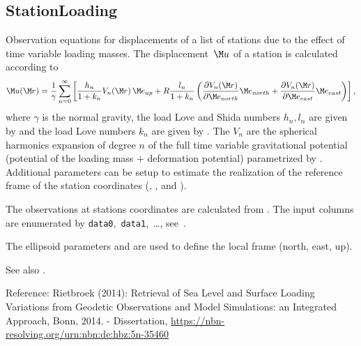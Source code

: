 \subsection{StationLoading}\label{observationType:stationLoading}
Observation equations for displacements of a list of stations
due to the effect of time variable loading masses. The displacement~$\M u$ of a station is calculated according to
\begin{equation}
\M u(\M r) = \frac{1}{\gamma}\sum_{n=0}^\infty \left[\frac{h_n}{1+k_n}V_n(\M r)\,\M e_{up}
+ R\frac{l_n}{1+k_n}\left(
 \frac{\partial V_n(\M r)}{\partial \M e_{north}}\M e_{north}
+\frac{\partial V_n(\M r)}{\partial \M e_{east}} \M e_{east}\right)\right],
\end{equation}
where $\gamma$ is the normal gravity, the load Love and Shida numbers $h_n,l_n$ are given by
 and the load Love numbers $k_n$ are given by
.
The $V_n$ are the spherical harmonics expansion of degree $n$ of the full time variable
gravitational potential (potential of the loading mass + deformation potential)
parametrized by .
Additional parameters can be setup to estimate the realization of the reference frame
of the station coordinates (,
, and ).

The observations at stations coordinates are calculated from
.
The input columns are enumerated by \verb|data0|,~\verb|data1|,~\ldots,
see~.

The ellipsoid parameters  and  are used
to define the local frame (north, east, up).

See also .

Reference:
Rietbroek (2014): Retrieval of Sea Level and Surface Loading Variations from Geodetic Observations
and Model Simulations: an Integrated Approach, Bonn, 2014. - Dissertation,
\url{https://nbn-resolving.org/urn:nbn:de:hbz:5n-35460}


